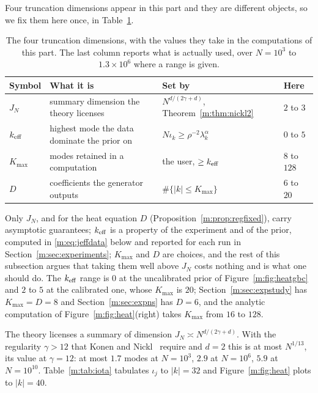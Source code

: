 Four truncation dimensions appear in this part and they are different objects, so we fix them here once, in Table~\ref{m:tab:dims}.

\begin{table}[t]\centering\small
\caption{The four truncation dimensions, with the values they take in the computations of this part. The last column reports what is actually used, over $N=10^3$ to $1.3\times10^6$ where a range is given.}\label{m:tab:dims}
\begin{tabular}{@{}l>{\raggedright\arraybackslash}p{1.35in}>{\raggedright\arraybackslash}p{1.5in}l@{}}
\toprule
Symbol & What it is & Set by & Here\\
\midrule
$J_N$ & summary dimension the theory licenses & $N^{d/(2\gamma+d)}$, Theorem~\ref{m:thm:nickl2} & $2$ to $3$\\
$k_{\rm eff}$ & highest mode the data dominate the prior on & $N\iota_k\ge\rho^{-2}\lambda_k^\alpha$ & $0$ to $5$\\
$K_{\max}$ & modes retained in a computation & the user, $\ge k_{\rm eff}$ & $8$ to $128$\\
$D$ & coefficients the generator outputs & $\#\{|k|\le K_{\max}\}$ & $6$ to $20$\\
\bottomrule
\end{tabular}
\end{table}

\noindent Only $J_N$, and for the heat equation $D$ (Proposition~\ref{m:prop:regfixed}), carry asymptotic guarantees; $k_{\rm eff}$ is a property of the experiment and of the prior, computed in \eqref{m:eq:jeffdata} below and reported for each run in Section~\ref{m:sec:experiments}; $K_{\max}$ and $D$ are choices, and the rest of this subsection argues that taking them well above $J_N$ costs nothing and is what one should do. The $k_{\rm eff}$ range is $0$ at the uncalibrated prior of Figure~\ref{m:fig:heatgbc} and $2$ to $5$ at the calibrated one, whose $K_{\max}$ is $20$; Section~\ref{m:sec:expstudy} has $K_{\max}=D=8$ and Section~\ref{m:sec:expns} has $D=6$, and the analytic computation of Figure~\ref{m:fig:heat}(right) takes $K_{\max}$ from $16$ to $128$.

The theory licenses a summary of dimension $J_N\asymp N^{d/(2\gamma+d)}$. With the regularity $\gamma>12$ that Konen and Nickl~\cite{konennickl2026} require and $d=2$ this is at most $N^{1/13}$, its value at $\gamma=12$: at most $1.7$ modes at $N=10^3$, $2.9$ at $N=10^6$, $5.9$ at $N=10^{10}$. Table~\ref{m:tab:iota} tabulates $\iota_j$ to $|k|=32$ and Figure~\ref{m:fig:heat} plots to $|k|=40$.

